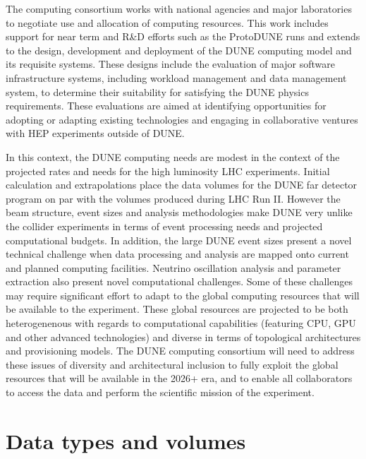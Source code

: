 The computing consortium works with national agencies and major laboratories to negotiate use and allocation of computing resources.  This work includes support for near term and R\&D efforts such as the ProtoDUNE runs and extends to the design, development and deployment of the DUNE computing model and its requisite systems.
These designs include the evaluation of major software infrastructure systems, including workload management and data management system, to determine their suitability for satisfying the DUNE physics requirements.   These evaluations are aimed at identifying opportunities for adopting or adapting existing technologies and engaging in collaborative ventures with HEP experiments outside of DUNE.

In this context, the DUNE computing needs are modest in the context of the projected rates and needs for the high luminosity LHC experiments.  Initial calculation and extrapolations place the data volumes for the DUNE far detector program on par with the volumes produced during LHC Run II.  However the  beam structure, event sizes and analysis methodologies make DUNE very unlike the collider experiments in terms of event processing needs and projected computational budgets.  In addition, the large DUNE event sizes present a novel technical challenge when data processing and analysis are mapped onto  current and planned computing facilities.  Neutrino oscillation analysis and parameter extraction also present novel computational challenges.   Some of these challenges may require significant effort to adapt to the global computing resources that will be available to the experiment.  These global resources are projected to be both heterogenenous with regards to computational capabilities (featuring CPU, GPU and other advanced technologies) and diverse in terms of topological architectures and provisioning models.  The DUNE computing consortium will need to address these issues of diversity and architectural inclusion to fully exploit the global resources that will be available in the 2026+ era, and to enable all collaborators to access the data and perform the scientific mission of the experiment.

\section{Data types and volumes}

